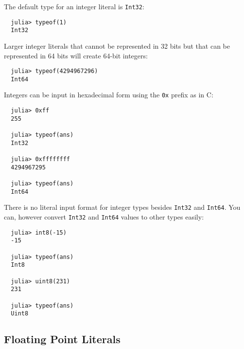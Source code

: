 \documentclass{article}
\renewcommand{\sec}[1]{\label{sec:#1}}
\begin{document}
The default type for an integer literal is \verb|Int32|:
\begin{verbatim}
  julia> typeof(1)
  Int32
\end{verbatim}
Larger integer literals that cannot be represented in 32 bits but that can be represented in 64 bits will create 64-bit integers:
\begin{verbatim}
  julia> typeof(4294967296)
  Int64
\end{verbatim}
Integers can be input in hexadecimal form using the \verb|0x| prefix as in C:
\begin{verbatim}
  julia> 0xff
  255

  julia> typeof(ans)
  Int32

  julia> 0xffffffff
  4294967295

  julia> typeof(ans)
  Int64
\end{verbatim}
There is no literal input format for integer types besides \verb|Int32| and \verb|Int64|. You can, however convert \verb|Int32| and \verb|Int64| values to other types easily:
\begin{verbatim}
  julia> int8(-15)
  -15

  julia> typeof(ans)
  Int8

  julia> uint8(231)
  231

  julia> typeof(ans)
  Uint8
\end{verbatim}

\subsection{Floating Point Literals}\sec{floating-point-literals}
\end{document}
